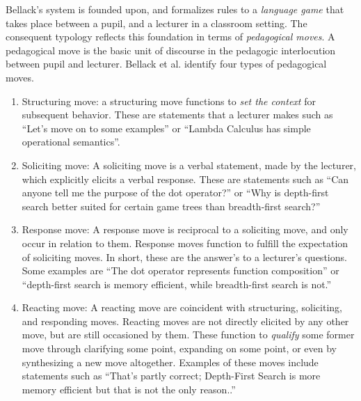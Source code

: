 \documentclass[conference]{IEEEtran}
\begin{document}
Bellack's system is founded upon, and formalizes rules to a \emph{language
  game}\cite{wittgenstein2010philosophical} that takes place between a pupil,
and a lecturer in a classroom setting. The consequent typology reflects this
foundation in terms of \emph{pedagogical moves}. A pedagogical move is the basic
unit of discourse in the pedagogic interlocution between pupil and lecturer.
Bellack et al. identify four types of pedagogical moves.
%
\begin{enumerate}[P1.]

  \item \label{contrib:struct}
    Structuring move: a structuring move functions to \emph{set the context} for
    subsequent behavior. These are statements that a lecturer makes such as
    ``Let's move on to some examples'' or ``Lambda Calculus has simple
    operational semantics''.
  
  \item \label{contrib:solicit}
    Soliciting move: A soliciting move is a verbal statement, made by the
    lecturer, which explicitly elicits a verbal response. These are statements
    such as ``Can anyone tell me the purpose of the dot operator?'' or ``Why is
    depth-first search better suited for certain game trees than breadth-first search?''

   \item \label{contrib:response}
     Response move: A response move is reciprocal to a soliciting move, and only
     occur in relation to them. Response moves function to fulfill the
     expectation of soliciting moves. In short, these are the answer's to a
     lecturer's questions. Some examples are ``The dot operator represents
     function composition'' or ``depth-first search is memory efficient, while
     breadth-first search is not.''

   \item \label{contrib:react}
     Reacting move: A reacting move are coincident with structuring, soliciting,
     and responding moves. Reacting moves are not directly elicited by any other
     move, but are still occasioned by them. These function to \emph{qualify}
     some former move through clarifying some point, expanding on some point, or
     even by synthesizing a new move altogether. Examples of these moves include
     statements such as ``That's partly correct; Depth-First Search is more
     memory efficient but that is not the only reason..''

\end{enumerate}
\end{document}
